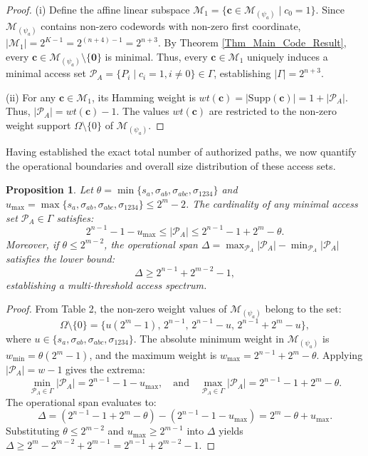 \documentclass[pdflatex,sn-mathphys-num]{sn-jnl}%
\theoremstyle{thmstyleone}%
\newtheorem{proposition}[theorem]{Proposition}%
\theoremstyle{thmstyletwo}%
\theoremstyle{thmstylethree}%
\begin{document}
\begin{proof}
(i) Define the affine linear subspace $\mathcal{M}_1 = \{\mathbf{c} \in \mathcal{M}_{(\psi_a)} \mid c_0 = 1\}$. Since $\mathcal{M}_{(\psi_a)}$ contains non-zero codewords with non-zero first coordinate, $|\mathcal{M}_1| = 2^{K-1} = 2^{(n+4)-1} = 2^{n+3}$. By Theorem \ref{Thm_Main_Code_Result}, every $\mathbf{c} \in \mathcal{M}_{(\psi_a)} \setminus \{\mathbf{0}\}$ is minimal. Thus, every $\mathbf{c} \in \mathcal{M}_1$ uniquely induces a minimal access set $\mathcal{P}_A = \{P_i \mid c_i = 1, i \neq 0\} \in \Gamma$, establishing $|\Gamma| = 2^{n+3}$.

(ii) For any $\mathbf{c} \in \mathcal{M}_1$, its Hamming weight is $wt(\mathbf{c}) = |\mathrm{Supp}(\mathbf{c})| = 1 + |\mathcal{P}_A|$. Thus, $|\mathcal{P}_A| = wt(\mathbf{c}) - 1$. The values $wt(\mathbf{c})$ are restricted to the non-zero weight support $\Omega \setminus \{0\}$ of $\mathcal{M}_{(\psi_a)}$.
\end{proof}

Having established the exact total number of authorized paths, we now quantify the operational boundaries and overall size distribution of these access sets.

\begin{proposition}\label{prop:access_bounds}
Let $\theta = \min\{s_a, \sigma_{ab}, \sigma_{abc}, \sigma_{1234}\}$ and $u_{\max} = \max\{s_a, \sigma_{ab}, \sigma_{abc}, \sigma_{1234}\} \le 2^m - 2$. The cardinality of any minimal access set $\mathcal{P}_A \in \Gamma$ satisfies:
\[
2^{n-1} - 1 - u_{\max} \le |\mathcal{P}_A| \le 2^{n-1} - 1 + 2^m - \theta.
\]
Moreover, if $\theta \le 2^{m-2}$, the operational span $\Delta = \max_{\mathcal{P}_A}|\mathcal{P}_A| - \min_{\mathcal{P}_A}|\mathcal{P}_A|$ satisfies the lower bound:
\[
\Delta \ge 2^{n-1} + 2^{m-2} - 1,
\]
establishing a multi-threshold access spectrum.
\end{proposition}

\begin{proof}
From Table 2, the non-zero weight values of $\mathcal{M}_{(\psi_a)}$ belong to the set:
\[
\Omega \setminus \{0\} = \{u(2^m-1), \, 2^{n-1}, \, 2^{n-1}-u, \, 2^{n-1}+2^m-u\},
\]
where $u \in \{s_a, \sigma_{ab}, \sigma_{abc}, \sigma_{1234}\}$. The absolute minimum weight in $\mathcal{M}_{(\psi_a)}$ is $w_{\min} = \theta(2^m-1)$, and the maximum weight is $w_{\max} = 2^{n-1} + 2^m - \theta$. Applying $|\mathcal{P}_A| = w - 1$ gives the extrema:
\[
\min_{\mathcal{P}_A \in \Gamma} |\mathcal{P}_A| = 2^{n-1} - 1 - u_{\max}, \quad \text{and} \quad \max_{\mathcal{P}_A \in \Gamma} |\mathcal{P}_A| = 2^{n-1} - 1 + 2^m - \theta.
\]
The operational span evaluates to:
\[
\Delta = (2^{n-1} - 1 + 2^m - \theta) - (2^{n-1} - 1 - u_{\max}) = 2^m - \theta + u_{\max}.
\]
Substituting $\theta \le 2^{m-2}$ and $u_{\max} \ge 2^{m-1}$ into $\Delta$ yields $\Delta \ge 2^m - 2^{m-2} + 2^{m-1} = 2^{n-1} + 2^{m-2} - 1$.
\end{proof}
\end{document}
